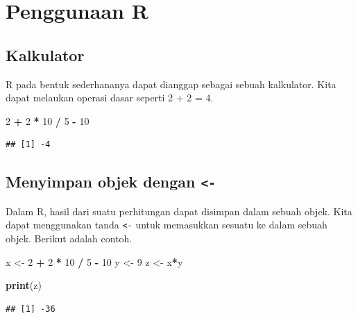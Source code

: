 \documentclass[]{book}
\newenvironment{Shaded}{\begin{snugshade}}{\end{snugshade}}
\newcommand{\KeywordTok}[1]{\textcolor[rgb]{0.13,0.29,0.53}{\textbf{#1}}}
\newcommand{\DecValTok}[1]{\textcolor[rgb]{0.00,0.00,0.81}{#1}}
\newcommand{\StringTok}[1]{\textcolor[rgb]{0.31,0.60,0.02}{#1}}
\newcommand{\OperatorTok}[1]{\textcolor[rgb]{0.81,0.36,0.00}{\textbf{#1}}}
\newcommand{\NormalTok}[1]{#1}
\begin{document}
\section{Penggunaan R}\label{penggunaan-r}

\subsection{Kalkulator}\label{kalkulator}

R pada bentuk sederhananya dapat dianggap sebagai sebuah kalkulator.
Kita dapat melaukan operasi dasar seperti 2 + 2 = 4.

\begin{Shaded}
\begin{Highlighting}[]
\DecValTok{2} \OperatorTok{+}\StringTok{ }\DecValTok{2} \OperatorTok{*}\StringTok{ }\DecValTok{10} \OperatorTok{/}\StringTok{ }\DecValTok{5} \OperatorTok{-}\StringTok{ }\DecValTok{10}
\end{Highlighting}
\end{Shaded}

\begin{verbatim}
## [1] -4
\end{verbatim}

\subsection{\texorpdfstring{Menyimpan objek dengan
\texttt{\textless{}-}}{Menyimpan objek dengan \textless{}-}}\label{menyimpan-objek-dengan--}

Dalam R, hasil dari suatu perhitungan dapat disimpan dalam sebuah objek.
Kita dapat menggunakan tanda \texttt{\textless{}-} untuk memasukkan
sesuatu ke dalam sebuah objek. Berikut adalah contoh.

\begin{Shaded}
\begin{Highlighting}[]
\NormalTok{x <-}\StringTok{ }\DecValTok{2} \OperatorTok{+}\StringTok{ }\DecValTok{2} \OperatorTok{*}\StringTok{ }\DecValTok{10} \OperatorTok{/}\StringTok{ }\DecValTok{5} \OperatorTok{-}\StringTok{ }\DecValTok{10}
\NormalTok{y <-}\StringTok{ }\DecValTok{9}
\NormalTok{z <-}\StringTok{ }\NormalTok{x}\OperatorTok{*}\NormalTok{y}

\KeywordTok{print}\NormalTok{(z)}
\end{Highlighting}
\end{Shaded}

\begin{verbatim}
## [1] -36
\end{verbatim}
\end{document}
